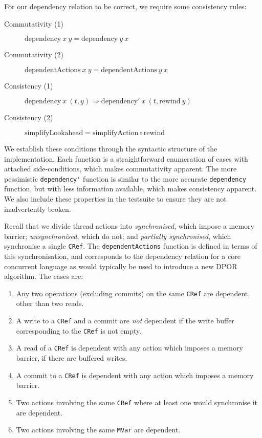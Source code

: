 For our dependency relation to be correct, we require some consistency
rules:

\begin{description}
\item[Commutativity (1)]
  $\mathrm{dependency}~x~y = \mathrm{dependency}~y~x$
\item[Commutativity (2)]
  $\mathrm{dependentActions}~x~y = \mathrm{dependentActions}~y~x$
\item[Consistency (1)]
  $\mathrm{dependency}~x~(t,y) \Rightarrow \mathrm{dependency'}~x~(t, \mathrm{rewind}~y)$
\item[Consistency (2)]
  $\mathrm{simplifyLookahead} = \mathrm{simplifyAction} \circ \mathrm{rewind}$
\end{description}

We establish these conditions through the syntactic structure of the
implementation.  Each function is a straightforward enumeration of
cases with attached side-conditions, which makes commutativity
apparent.  The more pessimistic \verb|dependency'| function is similar
to the more accurate \verb|dependency| function, but with less
information available, which makes consistency apparent.  We also
include these properties in the \dejafu{} testsuite to ensure they are
not inadvertently broken.

Recall that we divide thread actions into \emph{synchronised}, which
impose a memory barrier; \emph{unsynchronised}, which do not; and
\emph{partially synchronised}, which synchronise a single \verb|CRef|.
The \verb|dependentActions| function is defined in terms of this
synchronisation, and corresponds to the dependency relation for a core
concurrent language as would typically be used to introduce a new DPOR
algorithm.  The cases are:

\begin{enumerate}
\item Any two operations (excluding commits) on the same \verb|CRef|
  are dependent, other than two reads.
\item A write to a \verb|CRef| and a commit are \emph{not} dependent
  if the write buffer corresponding to the \verb|CRef| is not
  empty\cite{linden2013}.
\item A read of a \verb|CRef| is dependent with any action which
  imposes a memory barrier, if there are buffered writes.
\item A commit to a \verb|CRef| is dependent with any action which
  imposes a memory barrier.
\item Two actions involving the same \verb|CRef| where at least one
  would synchronise it are dependent.
\item Two actions involving the same \verb|MVar| are dependent.
\end{enumerate}

